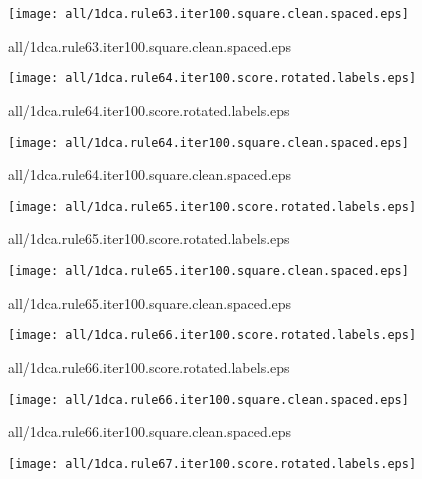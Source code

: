 \documentclass{article}
\begin{document}
\begin{center}
\begin{minipage}{\textwidth}
\texttt{[image: all/1dca.rule63.iter100.square.clean.spaced.eps]}
\end{minipage}
\end{center}
{\footnotesize all/1dca.rule63.iter100.square.clean.spaced.eps}
\begin{center}
\begin{minipage}{\textwidth}
\texttt{[image: all/1dca.rule64.iter100.score.rotated.labels.eps]}
\end{minipage}
\end{center}
{\footnotesize all/1dca.rule64.iter100.score.rotated.labels.eps}
\begin{center}
\begin{minipage}{\textwidth}
\texttt{[image: all/1dca.rule64.iter100.square.clean.spaced.eps]}
\end{minipage}
\end{center}
{\footnotesize all/1dca.rule64.iter100.square.clean.spaced.eps}
\begin{center}
\begin{minipage}{\textwidth}
\texttt{[image: all/1dca.rule65.iter100.score.rotated.labels.eps]}
\end{minipage}
\end{center}
{\footnotesize all/1dca.rule65.iter100.score.rotated.labels.eps}
\begin{center}
\begin{minipage}{\textwidth}
\texttt{[image: all/1dca.rule65.iter100.square.clean.spaced.eps]}
\end{minipage}
\end{center}
{\footnotesize all/1dca.rule65.iter100.square.clean.spaced.eps}
\begin{center}
\begin{minipage}{\textwidth}
\texttt{[image: all/1dca.rule66.iter100.score.rotated.labels.eps]}
\end{minipage}
\end{center}
{\footnotesize all/1dca.rule66.iter100.score.rotated.labels.eps}
\begin{center}
\begin{minipage}{\textwidth}
\texttt{[image: all/1dca.rule66.iter100.square.clean.spaced.eps]}
\end{minipage}
\end{center}
{\footnotesize all/1dca.rule66.iter100.square.clean.spaced.eps}
\begin{center}
\begin{minipage}{\textwidth}
\texttt{[image: all/1dca.rule67.iter100.score.rotated.labels.eps]}
\end{minipage}
\end{center}
\end{document}
